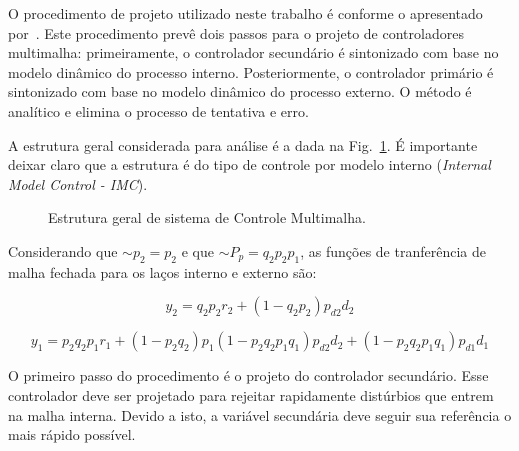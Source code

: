     O procedimento de projeto utilizado neste trabalho é conforme o apresentado
    por~\cite{ref:LEE}. Este procedimento prevê dois passos para o projeto de
    controladores multimalha: primeiramente, o controlador secundário é sintonizado
    com base no modelo dinâmico do processo interno. Posteriormente, o controlador
    primário é sintonizado com base no modelo dinâmico do processo externo. O
    método é analítico e elimina o processo de tentativa e erro.

    A estrutura geral considerada para análise é a dada na
    Fig.~\ref{fig:multiloop_lee}. É importante deixar claro que a estrutura é
    do tipo de controle por modelo interno (\textit{Internal Model Control - IMC}).

    \begin{figure}[htb]
        \renewcommand\figurename{Fig.}
        \caption{Estrutura geral de sistema de Controle Multimalha.}
        \label{fig:multiloop_lee}
    \end{figure}

    Considerando que $\sim$$p_2 = p_2$ e que $\sim$$P_p = q_2 p_2 p_1$, as funções de
    tranferência de malha fechada para os laços interno e externo são:

    \begin{equation}
        y_2 = q_2 p_2 r_2 + \left( 1- q_2 p_2 \right) p_{d2} d_2
    \end{equation}

    \begin{equation}
        y_1 = p_2 q_2 p_1 r_1 + \left( 1 - p_2 q_2 \right) p_1 \left(
            1 - p_2 q_2 p_1 q_1 \right) p_{d2} d_2 + \left( 1 - p_2 q_2 p_1 q_1
            \right) p_{d1} d_1
    \end{equation}

    O primeiro passo do procedimento é o projeto do controlador secundário. Esse
    controlador deve ser projetado para rejeitar rapidamente distúrbios que entrem
    na malha interna. Devido a isto, a variável secundária deve seguir sua referência
    o mais rápido possível.

